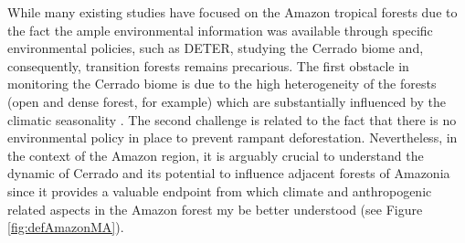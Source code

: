 
While many existing studies have focused on the Amazon tropical forests \citep{PFAFF,PFAFF2,HAMMIG,GEIST, GEIST2, LAMBIN2,PFAFF3,ZAMBRANO,KUIK,COE,SOLER,NEPSTAD,ARIMA,PATZ,RICHARDS,RICHARDS2,CELENTANO_2017} due to the fact the ample environmental information was available through specific environmental policies, such as DETER, studying the Cerrado biome and, consequently, transition forests remains precarious. The first obstacle in monitoring the Cerrado biome is due to the high heterogeneity of the forests (open and dense forest, for example) which are substantially influenced by the climatic seasonality \citep{bayma_sano_2015}. The second challenge is related to the fact that there is no environmental policy in place to prevent rampant deforestation.  Nevertheless, in the context of the Amazon region, it is arguably crucial to understand the dynamic of Cerrado and its potential to influence adjacent forests of Amazonia since it provides a valuable endpoint from which climate and anthropogenic related aspects in the Amazon forest my be better understood (see Figure \ref{fig:defAmazonMA}).  




